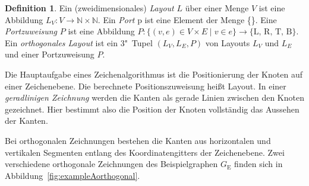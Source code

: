 \documentclass[a4paper]{scrreprt}
\theoremstyle{definition}
\newtheorem{definition}[satz]{Definition}
\newcommand{\N}{\mathbb{N}}
\begin{document}
\begin{definition}
  \label{def:layouts}
  Ein (zweidimensionales) \emph{Layout} $L$ über einer Menge $V$ ist eine Abbildung $L_V : V \to \N \times \N $. Ein \emph{Port} p ist eine Element der Menge \{\}. Eine \emph{Portzuweisung} $P$ ist eine Abbildung $P: \{(v, e) \in V \times E \mid v \in e\} \to \{\text{L, R, T, B}\}$. Ein \emph{orthogonales Layout} ist ein 3"~Tupel $(L_V,L_E,P)$ von Layouts $L_V$ und $L_E$ und einer Portzuweisung $P$.
\end{definition}

Die Hauptaufgabe eines Zeichenalgorithmus ist die Positionierung der Knoten auf einer Zeichenebene. Die berechnete Positionszuweisung heißt Layout. In einer \emph{geradlinigen Zeichnung} werden die Kanten als gerade Linien zwischen den Knoten gezeichnet. Hier bestimmt also die Position der Knoten vollständig das Aussehen der Kanten.

Bei orthogonalen Zeichnungen bestehen die Kanten aus horizontalen und vertikalen Segmenten entlang des Koordinatengitters der Zeichenebene. Zwei verschiedene orthogonale Zeichnungen des Beispielgraphen $G_\text{E}$ finden sich in Abbildung~\ref{fig:exampleAorthogonal}.
\end{document}

